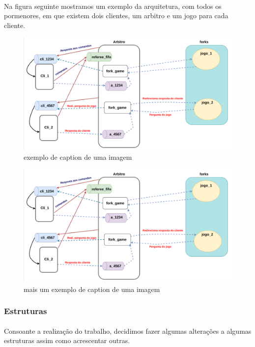 \documentclass[letterpaper, 11pt]{article}
\begin{document}
\paragraph{}
Na figura seguinte mostramos um exemplo da arquitetura, com todos os pormenores, em que existem dois clientes, um arbitro e um jogo para cada cliente.


\begin{figure}[htbp]
\centering
\includegraphics[width=.9\linewidth]{images/esquema.png}
\caption{\label{fig:org9334cce}
exemplo de caption de uma imagem}
\end{figure}

\begin{figure}[htbp]
\centering
\includegraphics[width=.9\linewidth]{images/esquema.png}
\caption{\label{fig:org774ede4}
mais um exemplo de caption de uma imagem}
\end{figure}



\subsubsection{Estruturas}
\label{sec:org0b08fbe}

\paragraph{}
Consoante a realização do trabalho, decidimos fazer algumas alterações a algumas estruturas assim como acrescentar outras.
\end{document}
